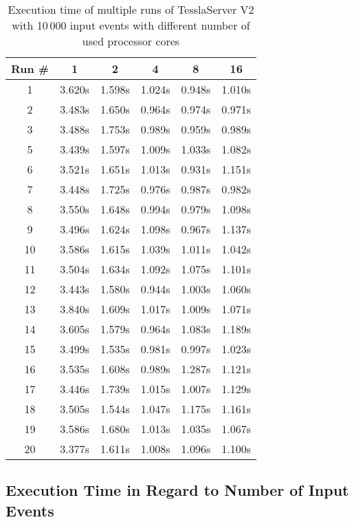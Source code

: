 \begin{table}[!htb]
  \centering
  \caption{Execution time of multiple runs of TesslaServer V2 with 10\,000 input events with different number of used processor cores}
  \label{table:tessla_server_v2_num_cores_data}
  \begin{tabular}{clllll}
    Run \# & \multicolumn{1}{c}{1} & \multicolumn{1}{c}{2} & \multicolumn{1}{c}{4} & \multicolumn{1}{c}{8} & \multicolumn{1}{c}{16} \\ \hline
    1 &  3.620s & 1.598s & 1.024s   & 0.948s  & 1.010s \\
    2 &  3.483s & 1.650s & 0.964s & 0.974s & 0.971s \\
    3 &  3.488s & 1.753s & 0.989s & 0.959s & 0.989s \\
    5 &  3.439s & 1.597s & 1.009s   & 1.033s & 1.082s \\
    6 &  3.521s & 1.651s & 1.013s   & 0.931s & 1.151s \\
    7 &  3.448s & 1.725s & 0.976s & 0.987s & 0.982s \\
    8 &  3.550s & 1.648s & 0.994s & 0.979s & 1.098s \\
    9 &  3.496s & 1.624s & 1.098s & 0.967s & 1.137s   \\
    10 & 3.586s & 1.615s & 1.039s & 1.011s & 1.042s \\
    11 & 3.504s  & 1.634s & 1.092s & 1.075s & 1.101s \\
    12 & 3.443s & 1.580s & 0.944s & 1.003s & 1.060s \\
    13 & 3.840s & 1.609s & 1.017s & 1.009s & 1.071s \\
    14 & 3.605s & 1.579s & 0.964s & 1.083s & 1.189s \\
    15 & 3.499s & 1.535s & 0.981s & 0.997s & 1.023s  \\
    16 & 3.535s & 1.608s & 0.989s & 1.287s & 1.121s   \\
    17 & 3.446s & 1.739s & 1.015s & 1.007s & 1.129s \\
    18 & 3.505s & 1.544s & 1.047s & 1.175s & 1.161s \\
    19 & 3.586s & 1.680s & 1.013s & 1.035s & 1.067s   \\
    20 & 3.377s & 1.611s & 1.008s & 1.096s & 1.100s
  \end{tabular}
\end{table}

\clearpage

\subsection{Execution Time in Regard to Number of Input Events}
\label{sec:appendix:runtime_benchmark_data:execution_time_events}

